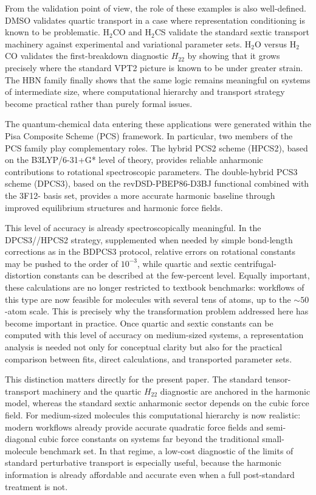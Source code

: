 From the validation point of view, the role of these examples is also
well-defined. DMSO validates quartic transport in a case where representation
conditioning is known to be problematic. H$_2$CO and H$_2$CS validate the
standard sextic transport machinery against experimental and variational
parameter sets. H$_2$O versus H$_2$CO validates the first-breakdown diagnostic
$H_{22}$ by showing that it grows precisely where the standard VPT2 picture is
known to be under greater strain. The HBN family finally shows that the same
logic remains meaningful on systems of intermediate size, where computational
hierarchy and transport strategy become practical rather than purely formal
issues.

The quantum-chemical data entering these applications were generated within
the Pisa Composite Scheme (PCS) framework. In particular, two members of the
PCS family play complementary roles. The hybrid PCS2 scheme (HPCS2), based on
the B3LYP/6-31+G* level of theory, provides reliable anharmonic contributions
to rotational spectroscopic parameters. The double-hybrid PCS3 scheme
(DPCS3), based on the revDSD-PBEP86-D3BJ functional combined with the 3F12-
basis set, provides a more accurate harmonic baseline through improved
equilibrium structures and harmonic force fields.\cite{pcs1234_2024,DPCS3_2023,BDPCS3_2023}

This level of accuracy is already spectroscopically meaningful. In the
DPCS3//HPCS2 strategy, supplemented when needed by simple bond-length
corrections as in the BDPCS3 protocol, relative errors on rotational
constants may be pushed to the order of $10^{-3}$, while quartic and sextic
centrifugal-distortion constants can be described at the few-percent level.
\cite{acr_2026,Boussessi_quartic,Boussessi_sextic,hormones_2024,fast_dvib_2025}
Equally important, these calculations are no longer restricted to textbook
benchmarks: workflows of this type are now feasible for molecules with several
tens of atoms, up to the $\sim 50$-atom scale.\cite{hormones_2024,fast_dvib_2025}
This is precisely why the transformation problem addressed here has become
important in practice. Once quartic and sextic constants can be computed with
this level of accuracy on medium-sized systems, a representation analysis is
needed not only for conceptual clarity but also for the practical comparison
between fits, direct calculations, and transported parameter sets.

This distinction matters directly for the present paper. The standard
tensor-transport machinery and the quartic $H_{22}$ diagnostic are anchored in
the harmonic model, whereas the standard sextic anharmonic sector depends on
the cubic force field. For medium-sized molecules this computational hierarchy
is now realistic: modern workflows already provide accurate quadratic force
fields and semi-diagonal cubic force constants on systems far beyond the
traditional small-molecule benchmark set.\cite{cubic-vib_2024,cubic-internal_2024,fast_dvib_2025,hormones_2024,RotBio_2023,AnnRevPC_2023}
In that regime, a low-cost
diagnostic of the limits of standard perturbative transport is especially
useful, because the harmonic information is already affordable and accurate
even when a full post-standard treatment is not.

